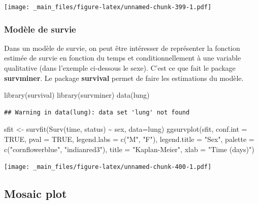 \documentclass[
]{book}
\newenvironment{Shaded}{\begin{snugshade}}{\end{snugshade}}
\newcommand{\AttributeTok}[1]{\textcolor[rgb]{0.77,0.63,0.00}{#1}}
\newcommand{\ConstantTok}[1]{\textcolor[rgb]{0.00,0.00,0.00}{#1}}
\newcommand{\FunctionTok}[1]{\textcolor[rgb]{0.00,0.00,0.00}{#1}}
\newcommand{\NormalTok}[1]{#1}
\newcommand{\OtherTok}[1]{\textcolor[rgb]{0.56,0.35,0.01}{#1}}
\newcommand{\SpecialCharTok}[1]{\textcolor[rgb]{0.00,0.00,0.00}{#1}}
\newcommand{\StringTok}[1]{\textcolor[rgb]{0.31,0.60,0.02}{#1}}
\theoremstyle{definition}
\theoremstyle{definition}
\theoremstyle{definition}
\theoremstyle{definition}
\theoremstyle{remark}
\begin{document}
\texttt{[image: \_main\_files/figure-latex/unnamed-chunk-399-1.pdf]}

\hypertarget{moduxe8le-de-survie}{%
\subsubsection{Modèle de survie}\label{moduxe8le-de-survie}}

Dans un modèle de survie, on peut être intéresser de représenter la fonction estimée de survie en fonction du temps et conditionnellement à une variable qualitative (dans l'exemple ci-dessous le sexe). C'est ce que fait le package \textbf{survminer}. Le package \textbf{survival} permet de faire les estimations du modèle.

\begin{Shaded}
\begin{Highlighting}[]
\FunctionTok{library}\NormalTok{(survival)}
\FunctionTok{library}\NormalTok{(survminer)}
\FunctionTok{data}\NormalTok{(lung)}
\end{Highlighting}
\end{Shaded}

\begin{verbatim}
## Warning in data(lung): data set 'lung' not found
\end{verbatim}

\begin{Shaded}
\begin{Highlighting}[]
\NormalTok{sfit }\OtherTok{\textless{}{-}} \FunctionTok{survfit}\NormalTok{(}\FunctionTok{Surv}\NormalTok{(time, status) }\SpecialCharTok{\textasciitilde{}}\NormalTok{  sex, }\AttributeTok{data=}\NormalTok{lung)}
\FunctionTok{ggsurvplot}\NormalTok{(sfit, }
  \AttributeTok{conf.int =} \ConstantTok{TRUE}\NormalTok{, }
  \AttributeTok{pval =} \ConstantTok{TRUE}\NormalTok{,}
  \AttributeTok{legend.labs =} \FunctionTok{c}\NormalTok{(}\StringTok{"M"}\NormalTok{, }\StringTok{"F"}\NormalTok{), }
  \AttributeTok{legend.title =} \StringTok{"Sex"}\NormalTok{,}
  \AttributeTok{palette =} \FunctionTok{c}\NormalTok{(}\StringTok{"cornflowerblue"}\NormalTok{, }\StringTok{"indianred3"}\NormalTok{),}
  \AttributeTok{title =} \StringTok{"Kaplan{-}Meier"}\NormalTok{,}
  \AttributeTok{xlab =} \StringTok{"Time (days)"}\NormalTok{)}
\end{Highlighting}
\end{Shaded}

\texttt{[image: \_main\_files/figure-latex/unnamed-chunk-400-1.pdf]}

\hypertarget{mosaic-plot}{%
\subsection{Mosaic plot}\label{mosaic-plot}}
\end{document}
